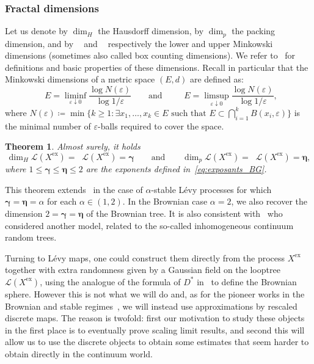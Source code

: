 \documentclass[british, a4paper,11pt]{article}
\numberwithin{equation}{section}
\newtheorem{thm}{\bfseries \upshape Theorem}[section]
\theoremstyle{definition}
\newcommand{\Loop}{\mathscr{L}}
\DeclareMathOperator{\diminf}{\underline{\dim}}%
\DeclareMathOperator{\dimsup}{\overline{\dim}}%
\newcommand{\bdgamma}{\boldsymbol{\gamma}}
\newcommand{\bdeta}{\boldsymbol{\eta}}
\newcommand{\exc}{\mathrm{ex}}
\begin{document}
\subsubsection*{Fractal dimensions}

Let us denote by $\dim_{H}$ the Hausdorff dimension, by $\dim_{p}$ the packing dimension, and by $\diminf$ and $\dimsup$ respectively the lower and upper Minkowski dimensions (sometimes also called box counting dimensions). We refer to~\cite[Chapter~4 and~5]{Mat95} for definitions and basic properties of these dimensions. Recall in particular that the Minkowski dimensions of a metric space $(E,d)$ are defined as:
\[\diminf E = \liminf_{\varepsilon \downarrow 0} \frac{\log N(\varepsilon)}{\log 1/\varepsilon}
\qquad\text{and}\qquad
\dimsup E = \limsup_{\varepsilon \downarrow 0} \frac{\log N(\varepsilon)}{\log 1/\varepsilon},\]
where $N(\varepsilon) \coloneqq \min\{k \geq 1 \colon \exists x_{1}, \dots, x_{k} \in E \text{ such that } E \subset \bigcap_{i=1}^{k} B(x_{i}, \varepsilon)\}$ is the minimal number of $\varepsilon$-balls required to cover the space.


\begin{thm}\label{thm:dimensions_fractales_Looptrees}
Almost surely, it holds
\[\dim_{H} \Loop(X^{\exc}) = \diminf \Loop(X^{\exc}) = \bdgamma
\qquad\text{and}\qquad
\dim_{p} \Loop(X^{\exc}) = \dimsup \Loop(X^{\exc}) = \bdeta,\]
where $1 \leq \bdgamma \leq \bdeta \leq 2$ are the exponents defined in~\eqref{eq:exposants_BG}.
\end{thm}

This theorem extends~\cite[Theorem~1.1]{CK14} in the case of $\alpha$-stable L\'evy processes for which $\bdgamma=\bdeta=\alpha$ for each $\alpha \in (1,2)$.
In the Brownian case $\alpha=2$, we also recover the dimension $2=\bdgamma=\bdeta$ of the Brownian tree.
It is also consistent with~\cite[Theorem~2.3]{BR22} who considered another model, related to the so-called inhomogeneous continuum random trees.

Turning to L\'evy maps, one could construct them directly from the process $X^{\exc}$ together with extra randomness given by a Gaussian field on the looptree $\Loop(X^{\exc})$, using the analogue of the formula of $D^\ast$ in~\cite{LG07, LG13, Mie13} to define the Brownian sphere.
However this is not what we will do and, as for the pioneer works in the Brownian and stable regimes~\cite{LG07, LGM11}, we will instead use approximations by rescaled discrete maps.
The reason is twofold: first our motivation to study these objects in the first place is to eventually prove scaling limit results, and second this will allow us to use the discrete objects to obtain some estimates that seem harder to obtain directly in the continuum world.
\end{document}
